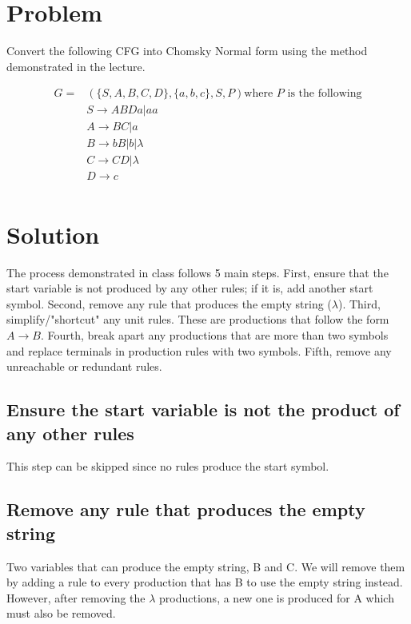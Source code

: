 \documentclass{assignment-x}
\begin{document}
\maketitle
\pagebreak

\section{Problem}
Convert the following CFG into Chomsky Normal form using the method demonstrated in the lecture.

\begin{align*}
    G=&(\{S,A,B,C,D\},\{a,b,c\}, S, P)\text{where $P$ is the following}\\
    &S \rightarrow ABDa|aa\\
    &A \rightarrow BC|a\\
    &B \rightarrow bB|b|\lambda\\
    &C \rightarrow CD|\lambda\\
    &D \rightarrow c\\
\end{align*}

\section{Solution}
The process demonstrated in class follows 5 main steps. 
First, ensure that the start variable is not produced by any other rules; if it is, add another start symbol.
Second, remove any rule that produces the empty string ($\lambda$).
Third, simplify/"shortcut" any unit rules. These are productions that follow the form $A \rightarrow B$.
Fourth, break apart any productions that are more than two symbols and replace terminals in production rules with two symbols.
Fifth, remove any unreachable or redundant rules.

\subsection{Ensure the start variable is not the product of any other rules}
This step can be skipped since no rules produce the start symbol.

\subsection{Remove any rule that produces the empty string}
Two variables that can produce the empty string, B and C.
We will remove them by adding a rule to every production that has B to use the empty string instead.
However, after removing the $\lambda$ productions, a new one is produced for A which must also be removed.
\end{document}
